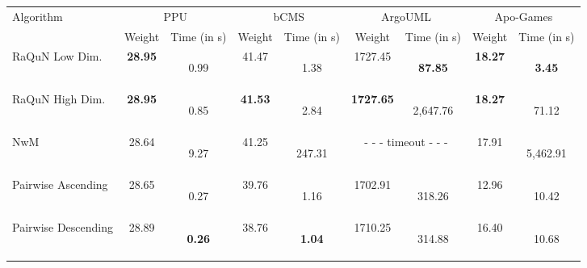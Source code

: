 \begin{tabular}{  l  c  c  c  c  c  c  c  c }
\hline
Algorithm & \multicolumn{2}{c}{PPU} & \multicolumn{2}{c}{bCMS} & \multicolumn{2}{c}{ArgoUML} & \multicolumn{2}{c}{Apo-Games} \\
 & Weight & Time (in s) & Weight & Time (in s) & Weight & Time (in s) & Weight & Time (in s) \\
\hline
RaQuN Low Dim. & \textbf{28.95}  & 0.99 \begin{tiny}[0.81, 1.33]\end{tiny} & 41.47  & 1.38 \begin{tiny}[1.32, 1.45]\end{tiny} & 1727.45  & \textbf{87.85} \begin{tiny}[71.06, 102.17]\end{tiny} & \textbf{18.27}  & \textbf{3.45} \begin{tiny}[2.78, 5.56]\end{tiny} \\
RaQuN High Dim. & \textbf{28.95}  & 0.85 \begin{tiny}[0.81, 0.90]\end{tiny} & \textbf{41.53}  & 2.84 \begin{tiny}[1.40, 3.58]\end{tiny} & \textbf{1727.65}  & 2,647.76 \begin{tiny}[1,483.48, 3,324.70]\end{tiny} & \textbf{18.27}  & 71.12 \begin{tiny}[41.30, 104.58]\end{tiny} \\
NwM & 28.64  & 9.27 \begin{tiny}[7.84, 10.07]\end{tiny} & 41.25  & 247.31 \begin{tiny}[227.52, 275.95]\end{tiny} & \multicolumn{2}{c}{- - - timeout - - -} & 17.91  & 5,462.91 \begin{tiny}[3,742.22, 6,597.83]\end{tiny} \\
Pairwise Ascending & 28.65  & 0.27 \begin{tiny}[0.22, 0.38]\end{tiny} & 39.76  & 1.16 \begin{tiny}[1.13, 1.21]\end{tiny} & 1702.91  & 318.26 \begin{tiny}[297.43, 379.76]\end{tiny} & 12.96  & 10.42 \begin{tiny}[9.32, 12.04]\end{tiny} \\
Pairwise Descending & 28.89  & \textbf{0.26} \begin{tiny}[0.21, 0.42]\end{tiny} & 38.76  & \textbf{1.04} \begin{tiny}[1.01, 1.07]\end{tiny} & 1710.25  & 314.88 \begin{tiny}[302.28, 329.35]\end{tiny} & 16.40  & 10.68 \begin{tiny}[9.27, 13.50]\end{tiny} \\
\hline
\end{tabular}
